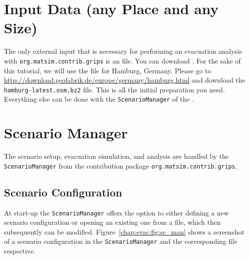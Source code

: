 \begin{description}
\end{description}

\section{Input Data (any Place and any Size)}
\label{grips:input}
The only external input that is necessary for performing an evacuation analysis with \lstinline|org.matsim.contrib.grips| is an  file.
You can download .
For the sake of this tutorial, we will use the file for Hamburg, Germany. Please go to \url{http://download.geofabrik.de/europe/germany/hamburg.html} and download the \lstinline|hamburg-latest.osm.bz2| file. This is all the initial preparation you need. Everything else can be done with the \lstinline|ScenarioManager| of the .

\section{Scenario Manager}
\label{grips:scm}
The scenario setup, evacuation simulation, and analysis are handled by the \lstinline|ScenarioManager| from the  contribution package \lstinline|org.matsim.contrib.grips|, 
\subsection{Scenario Configuration}
At start-up the \lstinline|ScenarioManager| offers the option to either defining a new scenario configuration or opening an existing one from a  file, which then subsequently can be modified. Figure~\ref{chap:evac:fig:sc_man} shows a screenshot of a scenario configuration in the \lstinline|ScenarioManager| and the corresponding  file respective.

